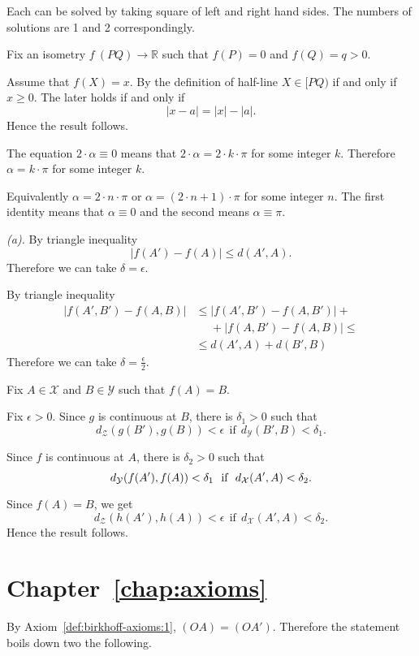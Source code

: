 Each can be solved by taking square of left and right hand sides.
The numbers of solutions are 1 and 2 correspondingly.

Fix an isometry $f\:(P Q)\to \mathbb{R}$ such that $f(P)=0$ and $f(Q)=q>0$.

Assume that $f(X)=x$.
By the definition of half-line $X\in[PQ)$ if and only if $x\ge 0$.
The later holds if and only if 
\[|x-a|=|x|-|a|.\]
Hence the result follows.


The equation
$2\cdot\alpha\equiv 0$
means that $2\cdot\alpha=2\cdot k\cdot\pi$ for some integer $k$.
Therefore
$\alpha=k\cdot\pi$ for some integer $k$.

Equivalently $\alpha=2\cdot n\cdot \pi$ or $\alpha=(2\cdot n+1)\cdot \pi$ for some integer $n$.
The first identity means that $\alpha\equiv 0$ and the second means $\alpha\equiv \pi$.

 \textit{(a).}
By triangle inequality 
$$|f(A')-f(A)|\le d(A',A).$$
Therefore we can take $\delta=\epsilon$.

By triangle inequality 
\begin{align*}
|f(A',B')-f(A,B)|
&\le |f(A',B')-f(A,B')|
+
\\
&\ \ \ \ \ \ +|f(A,B')-f(A,B)|
\le
\\
&\le d(A',A)+d(B',B)
\end{align*}
Therefore we can take $\delta=\tfrac\epsilon2$.

Fix $A\in \mathcal{X}$ and $B\in\mathcal{Y}$
such that $f(A)=B$.

Fix $\epsilon>0$.
Since $g$ is continuous at $B$, there is $\delta_1>0$ such that 
$$d_{\mathcal{Z}}(g(B'),g(B))<\epsilon\ \ \text{if}\ \  d_{\mathcal{Y}}(B',B)<\delta_1.$$ 

Since $f$ is continuous at $A$, there is $\delta_2>0$ such that 
$$d_{\mathcal{Y}}(f(A'),f(A))\z<\delta_1\ \ \text{if}\ \  d_{\mathcal{X}}(A',A)<\delta_2.$$ 

Since $f(A)=B$, we get
$$d_{\mathcal{Z}}(h(A'),h(A))<\epsilon\ \ \text{if}\ \ d_{\mathcal{X}}(A',A)<\delta_2.$$ 
Hence the result follows.


\section*{Chapter~\ref{chap:axioms}}
\setcounter{eqtn}{0}


\parbf{Exercise~\ref{ex:[OA)=[OA')}.}
By Axiom~\ref{def:birkhoff-axioms:1},
$(OA)=(OA')$.
Therefore the statement boils down two the following.

